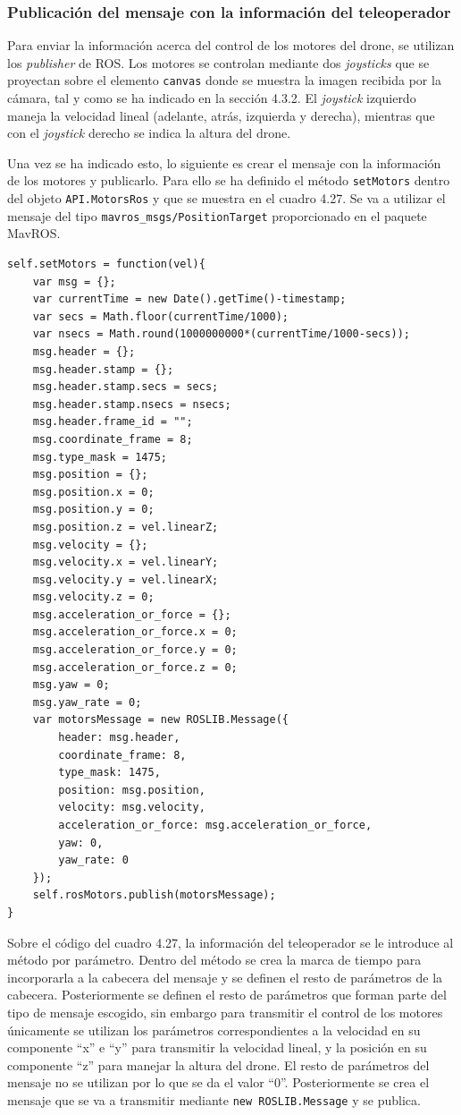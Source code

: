 \subsubsection{Publicación del mensaje con la información del teleoperador}

Para enviar la información acerca del control de los motores del drone, se utilizan los \textit{publisher} de ROS. Los motores se controlan mediante dos \textit{joysticks} que se proyectan sobre el elemento \texttt{canvas} donde se muestra la imagen recibida por la cámara, tal y como se ha indicado en la sección 4.3.2. El \textit{joystick} izquierdo maneja la velocidad lineal (adelante, atrás, izquierda y derecha), mientras que con el \textit{joystick} derecho se indica la altura del drone.

Una vez se ha indicado esto, lo siguiente es crear el mensaje con la información de los motores y publicarlo. Para ello se ha definido el método \texttt{setMotors} dentro del objeto \texttt{API.MotorsRos} y que se muestra en el cuadro 4.27. Se va a utilizar el mensaje del tipo \texttt{mavros\_msgs/PositionTarget} proporcionado en el paquete MavROS.

\begin{lstlisting}[caption= Publicar el mensaje con la información del teleoperador, label=cod.publishetmotors]
self.setMotors = function(vel){
	var msg = {};
	var currentTime = new Date().getTime()-timestamp;
	var secs = Math.floor(currentTime/1000);
	var nsecs = Math.round(1000000000*(currentTime/1000-secs));
	msg.header = {};
	msg.header.stamp = {};
	msg.header.stamp.secs = secs;
	msg.header.stamp.nsecs = nsecs;
	msg.header.frame_id = "";
	msg.coordinate_frame = 8;
	msg.type_mask = 1475;
	msg.position = {};
	msg.position.x = 0;
	msg.position.y = 0;
	msg.position.z = vel.linearZ;
	msg.velocity = {};
	msg.velocity.x = vel.linearY;
	msg.velocity.y = vel.linearX;
	msg.velocity.z = 0;
	msg.acceleration_or_force = {};
	msg.acceleration_or_force.x = 0;
	msg.acceleration_or_force.y = 0;
	msg.acceleration_or_force.z = 0;
	msg.yaw = 0;
	msg.yaw_rate = 0;
	var motorsMessage = new ROSLIB.Message({
		header: msg.header,
		coordinate_frame: 8,
		type_mask: 1475,
		position: msg.position,
		velocity: msg.velocity,
		acceleration_or_force: msg.acceleration_or_force,
		yaw: 0,
		yaw_rate: 0
	});
	self.rosMotors.publish(motorsMessage);
}
\end{lstlisting}

Sobre el código del cuadro 4.27, la información del teleoperador se le introduce al método por parámetro. Dentro del método se crea la marca de tiempo para incorporarla a la cabecera del mensaje y se definen el resto de parámetros de la cabecera. Posteriormente se definen el resto de parámetros que forman parte del tipo de mensaje escogido, sin embargo para transmitir el control de los motores únicamente se utilizan los parámetros correspondientes a la velocidad en su componente ``x'' e ``y'' para transmitir la velocidad lineal, y la posición en su componente ``z'' para manejar la altura del drone. El resto de parámetros del mensaje no se utilizan por lo que se da el valor ``0''. Posteriormente se crea el mensaje que se va a transmitir mediante \texttt{new ROSLIB.Message} y se publica.

